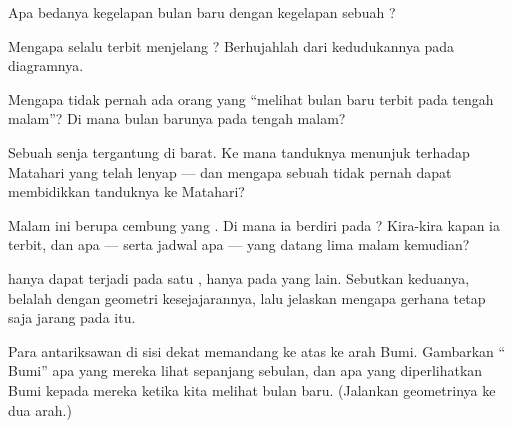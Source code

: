 \begin{exercise}[$\star$]\label{exo:g7:moon-phases:5}
Apa bedanya kegelapan bulan baru dengan kegelapan sebuah ?
\end{exercise}

\begin{exercise}[$\star$]\label{exo:g7:moon-phases:6}
Mengapa  selalu terbit menjelang ?
Berhujahlah dari kedudukannya pada diagramnya.
\end{exercise}

\begin{exercise}[$\star$]\label{exo:g7:moon-phases:7}
Mengapa tidak pernah ada orang yang ``melihat bulan baru terbit pada
tengah malam''? Di mana bulan barunya pada tengah malam?
\end{exercise}

\begin{exercise}[$\star$]\label{exo:g7:moon-phases:8}
Sebuah  senja tergantung di barat. Ke mana tanduknya menunjuk
terhadap Matahari yang telah lenyap --- dan mengapa sebuah  tidak
pernah dapat membidikkan tanduknya ke Matahari?
\end{exercise}

\begin{exercise}[$\star\star$]\label{exo:g7:moon-phases:9}
Malam ini  berupa cembung yang . Di mana ia berdiri pada
? Kira-kira kapan ia terbit, dan  apa --- serta jadwal apa
--- yang datang lima malam kemudian?
\end{exercise}

\begin{exercise}[$\star\star$]\label{exo:g7:moon-phases:10}
 hanya dapat terjadi pada satu , 
hanya pada  yang lain. Sebutkan keduanya, belalah dengan geometri
kesejajarannya, lalu jelaskan mengapa gerhana tetap saja jarang pada
 itu.
\end{exercise}

\begin{exercise}[$\star\star$]\label{exo:g7:moon-phases:11}
Para antariksawan di sisi dekat  memandang ke atas ke arah Bumi.
Gambarkan `` Bumi'' apa yang mereka lihat sepanjang sebulan, dan
 apa yang diperlihatkan Bumi kepada mereka ketika kita melihat
bulan baru. (Jalankan geometrinya ke dua arah.)
\end{exercise}

